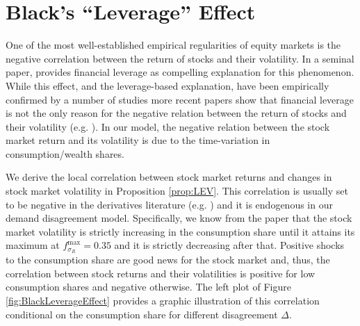 \section{Black's ``Leverage'' Effect}

One of the most well-established empirical regularities of equity markets is the negative correlation between the return of stocks and their volatility. In a seminal paper, \cite{Black1976} provides financial leverage as compelling explanation for this phenomenon. While this effect, and the leverage-based explanation, have been empirically confirmed by a number of studies more recent papers show that financial leverage is not the only reason for the negative relation between the return of stocks and their volatility (e.g. \cite{HasanhodzicLo2011}). %
In our model, the negative relation between the stock market return and its volatility is due to the time-variation in consumption/wealth shares.     


We derive the local correlation between stock market returns and changes in stock market volatility in Proposition \ref{prop:LEV}. This correlation is usually set to be negative in the derivatives literature (e.g. \cite{Heston1993}) and it is endogenous in our demand disagreement model. Specifically, we know from the paper that the stock market volatility is strictly increasing in the consumption share until it attains its maximum at $f_{\sigma_R}^{\text{max}}=0.35$ and it is strictly decreasing after that. Positive shocks to the consumption share are good news for the stock market and, thus, the correlation between stock returns and their volatilities is positive for low consumption shares and negative otherwise.  The left plot of Figure \ref{fig:BlackLeverageEffect} provides a graphic illustration of this correlation conditional on the consumption share for different disagreement $\Delta$.  


